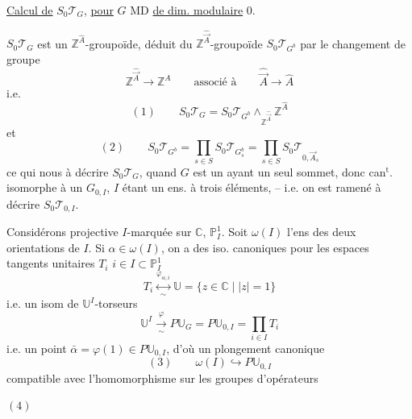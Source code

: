 \uline{Calcul de} $S_0\mathcal{T}_G$, \uline{pour} $G$ \uline{} MD \uline{de dim. modulaire} $0$.

\margin{\unsure{On notera} plutôt $S_0^{\circ}\mathcal{T}_G$ \unsure{pour ces} groupoïdes \unsure{étriqués|extrêmes}, \unsure{car} \unsure{bien trop petits}\unsure{]|)}}

$S_0\mathcal{T}_G$ est un $\mathbb{Z}^{\widehat{A}}$-groupoïde, déduit du $\mathbb{Z}^{\widehat{\vec A}}$-groupoïde $S_0\mathcal{T}_{G^b}$ par le changement de groupe  
\[
\mathbb{Z}^{\widehat{\vec A}}\longrightarrow\mathbb{Z}^{\widehat A}
\qquad\text{associé à}\qquad
\widehat{\vec A}\longrightarrow\widehat A
\]
i.e.
\[
(1)\qquad S_0\mathcal{T}_G=S_0\mathcal{T}_{G^b}\wedge_{\mathbb{Z}^{\widehat{\vec A}}}\mathbb{Z}^{\widehat A}
\]
et
\[
(2)\qquad S_0\mathcal{T}_{G^b}=\prod_{s\in S}S_0\mathcal{T}_{G_s^b}
=\prod_{s\in S}S_0\mathcal{T}_{0,\widehat{\vec A}_s}
\]
ce qui nous  à décrire $S_0\mathcal{T}_G$, quand $G$ est un  ayant un seul sommet, donc can$^{\mathrm t}$. isomorphe à un $G_{0,I}$, $I$ étant un ens. à trois éléments,  -- i.e. on est ramené à décrire  $S_0\mathcal{T}_{0,I}$.

Considérons   projective $I$-marquée sur $\mathbb C$, $\mathbb P^1_I$. Soit $\omega(I)$ l'ens des deux orientations de $I$. Si $\alpha\in\omega(I)$, on a des iso. canoniques  pour les espaces tangents unitaires $T_i$  $i\in I\subset\mathbb P^1_I$
\[
T_i\overset{\varphi_{\alpha,i}}{\underset{\sim}{\longleftrightarrow}}\mathbb U
=\{z\in\mathbb C\mid |z|=1\}
\]
i.e. un isom de $\mathbb U^I$-torseurs
\[
\mathbb U^I\xrightarrow[\sim]{\varphi}P\mathbb U_G=P\mathbb U_{0,I}=\prod_{i\in I}T_i
\]
i.e. un point  $\bar\alpha=\varphi(1)\in P\mathbb U_{0,I}$, d'où un plongement canonique
\[
(3)\qquad\omega(I)\hookrightarrow P\mathbb U_{0,I}
\]
compatible avec l'homomorphisme sur les groupes d'opérateurs

$(4)$\quad
{}

